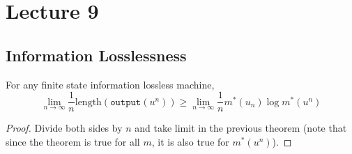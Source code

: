 \chapter{Lecture 9}
\section{Information Losslessness}
\begin{theorem}
For any finite state information lossless machine, 
\[\lim_{n\to\infty} \frac{1}{n}\text{length}(\texttt{output}(u^n)) \geq \lim_{n\to\infty} \frac{1}{n} m^*(u_n)\log m^*(u^n) \]
\end{theorem}
\begin{proof}
Divide both sides by $n$ and take limit in the previous theorem (note that since the theorem is true for all $m$, it is also true for $m^*(u^n)$).
\end{proof}
